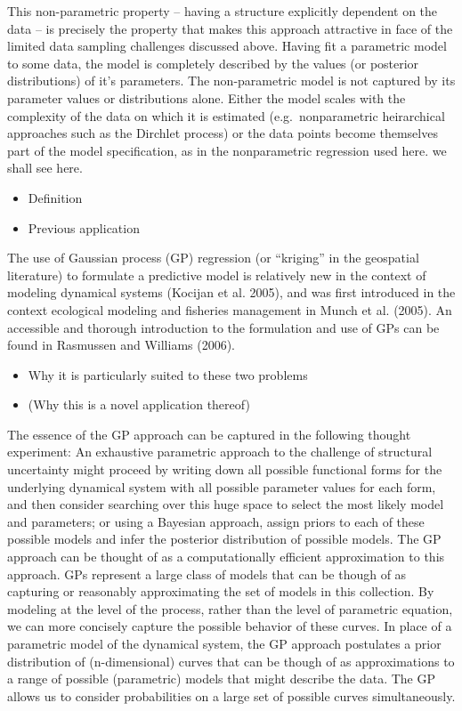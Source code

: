 \documentclass[author-year, review]{elsarticle} %
\begin{document}
This non-parametric property -- having a structure explicitly dependent
on the data -- is precisely the property that makes this approach
attractive in face of the limited data sampling challenges discussed
above. Having fit a parametric model to some data, the model is
completely described by the values (or posterior distributions) of it's
parameters. The non-parametric model is not captured by its parameter
values or distributions alone. Either the model scales with the
complexity of the data on which it is estimated (e.g.~nonparametric
heirarchical approaches such as the Dirchlet process) or the data points
become themselves part of the model specification, as in the
nonparametric regression used here. we shall see here.

\begin{itemize}
\item
  Definition
\item
  Previous application
\end{itemize}

The use of Gaussian process (GP) regression (or ``kriging'' in the
geospatial literature) to formulate a predictive model is relatively new
in the context of modeling dynamical systems (Kocijan et al. 2005), and
was first introduced in the context ecological modeling and fisheries
management in Munch et al. (2005). An accessible and thorough
introduction to the formulation and use of GPs can be found in Rasmussen
and Williams (2006).

\begin{itemize}
\itemsep1pt\parskip0pt
\item
  Why it is particularly suited to these two problems
\item
  (Why this is a novel application thereof)
\end{itemize}

The essence of the GP approach can be captured in the following thought
experiment: An exhaustive parametric approach to the challenge of
structural uncertainty might proceed by writing down all possible
functional forms for the underlying dynamical system with all possible
parameter values for each form, and then consider searching over this
huge space to select the most likely model and parameters; or using a
Bayesian approach, assign priors to each of these possible models and
infer the posterior distribution of possible models. The GP approach can
be thought of as a computationally efficient approximation to this
approach. GPs represent a large class of models that can be though of as
capturing or reasonably approximating the set of models in this
collection. By modeling at the level of the process, rather than the
level of parametric equation, we can more concisely capture the possible
behavior of these curves. In place of a parametric model of the
dynamical system, the GP approach postulates a prior distribution of
(n-dimensional) curves that can be though of as approximations to a
range of possible (parametric) models that might describe the data. The
GP allows us to consider probabilities on a large set of possible curves
simultaneously.
\end{document}
